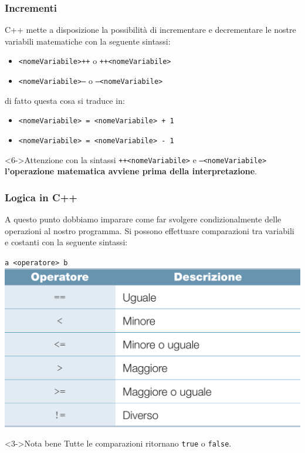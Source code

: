 \documentclass{beamer}
\begin{document}
    \begin{frame}
        \frametitle{Incrementi}
        C++ mette a disposizione la possibilità di incrementare e decrementare le nostre variabili matematiche con la seguente sintassi:
        \begin{itemize}
            \item<2-> \texttt{<nomeVariabile>++} o \texttt{++<nomeVariabile>}
            \item<3-> \texttt{<nomeVariabile>--} o \texttt{--<nomeVariabile>}
        \end{itemize}
         di fatto questa cosa si traduce in:
        \begin{itemize}
            \item<4-> \texttt{<nomeVariabile> = <nomeVariabile> + 1} 
            \item<5-> \texttt{<nomeVariabile> = <nomeVariabile> - 1} 
        \end{itemize}
        
        \begin{block}<6->{Attenzione}
            con la sintassi \texttt{++<nomeVariabile>} e \texttt{--<nomeVariabile>} \textbf{l'operazione matematica avviene prima della interpretazione}.
        \end{block}
    \end{frame}

    \begin{frame}[fragile]
        \frametitle{Logica in C++}
        A questo punto dobbiamo imparare come far svolgere condizionalmente delle operazioni al nostro programma. Si possono effettuare comparazioni tra variabili e costanti con la seguente sintassi:
        \begin{center}
            \Large{\texttt{a <operatore> b}} \\
             \includegraphics[scale=0.13]{img/logic_operators.png}
        \end{center}
        \begin{block}<3->{Nota bene}
            Tutte le comparazioni ritornano \texttt{true} o \texttt{false}.
        \end{block}
    \end{frame}
\end{document}
